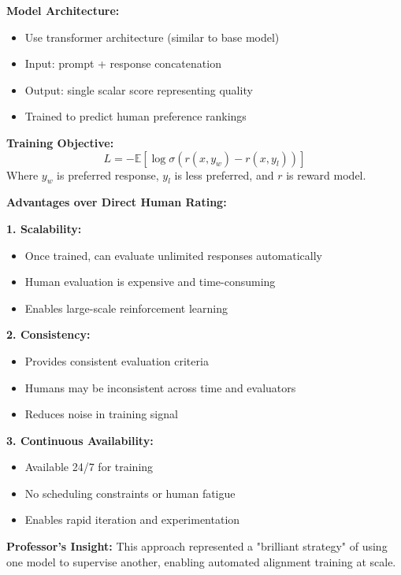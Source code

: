 \documentclass[12pt]{article}
\begin{document}
\begin{enumerate}
\begin{enumerate}[(a)]
\begin{enumerate}[(a)]
{    \textbf{Model Architecture:}
    \begin{itemize}
        \item Use transformer architecture (similar to base model)
        \item Input: prompt + response concatenation
        \item Output: single scalar score representing quality
        \item Trained to predict human preference rankings
    \end{itemize}
    
    \textbf{Training Objective:}
    $$L = -\mathbb{E}[\log \sigma(r(x, y_w) - r(x, y_l))]$$
    Where $y_w$ is preferred response, $y_l$ is less preferred, and $r$ is reward model.
    
    \textbf{Advantages over Direct Human Rating:}
    
    \textbf{1. Scalability:}
    \begin{itemize}
        \item Once trained, can evaluate unlimited responses automatically
        \item Human evaluation is expensive and time-consuming
        \item Enables large-scale reinforcement learning
    \end{itemize}
    
    \textbf{2. Consistency:}
    \begin{itemize}
        \item Provides consistent evaluation criteria
        \item Humans may be inconsistent across time and evaluators
        \item Reduces noise in training signal
    \end{itemize}
    
    \textbf{3. Continuous Availability:}
    \begin{itemize}
        \item Available 24/7 for training
        \item No scheduling constraints or human fatigue
        \item Enables rapid iteration and experimentation
    \end{itemize}
    
    \textbf{Professor's Insight:}
    This approach represented a "brilliant strategy" of using one model to supervise another, enabling automated alignment training at scale.
    }
    

\end{enumerate}
\end{enumerate}
\end{enumerate}
\end{document}
